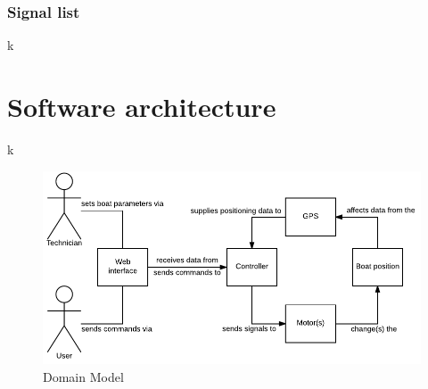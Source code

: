 \subsubsection{Signal list}
k

\section{Software architecture}
k

\begin{figure}[H]
	\centering
	\includegraphics[width=1\linewidth]{Images/System_architecture/Domain_Model}
	\caption{Domain Model}
	\label{fig:domainmodel}
\end{figure}

